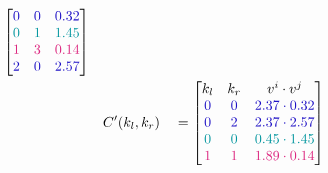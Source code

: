 \begin{figure}[H]
\begin{alignat*}{5}
\begin{bmatrix}
                                                               \color{blind-blue}0      & \color{blind-blue}0      & \color{blind-blue}0.32      \\
                                                               \color{blind-turquoise}0 & \color{blind-turquoise}1 & \color{blind-turquoise}1.45 \\
                                                               \color{blind-purple}1    & \color{blind-purple}3    & \color{blind-purple}0.14    \\
                                                               \color{blind-blue}2      & \color{blind-blue}0      & \color{blind-blue}2.57      \\
                                                           \end{bmatrix}
        \\
         &             &              & C'(k_l, k_r)   &                                                                                      & = \begin{bmatrix}
                                                                                                                                                      k_l                      & k_r                      & v^i \cdot v^j                                \\
                                                                                                                                                      \color{blind-blue}0      & \color{blind-blue}0      & \mathcolor{blind-blue}{2.37 \cdot 0.32}      \\
                                                                                                                                                      \color{blind-blue}0      & \color{blind-blue}2      & \mathcolor{blind-blue}{2.37 \cdot 2.57}      \\
                                                                                                                                                      \color{blind-turquoise}0 & \color{blind-turquoise}0 & \mathcolor{blind-turquoise}{0.45 \cdot 1.45} \\
                                                                                                                                                      \color{blind-purple}1    & \color{blind-purple}1    & \mathcolor{blind-purple}{1.89 \cdot 0.14}    \\
                                                                                                                                                  \end{bmatrix}

\end{alignat*}
\end{figure}
